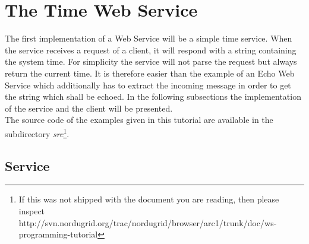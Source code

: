 \chapter{The Time Web Service}


The first implementation of a Web Service will be a simple time service. 
When the service receives a request of a client, it will respond with a string containing the system time.
For simplicity the service will not parse the request but always return the current time.
It is therefore easier than the example of an Echo Web Service which additionally has to extract the incoming message in order to get the string which shall be echoed.
In the following subsections the implementation of the service and the client will be presented.\\

The source code of the examples given in this tutorial are available in the subdirectory \textit{src}\footnote{If this was not shipped with the document you are reading, then please inspect\\ http://svn.nordugrid.org/trac/nordugrid/browser/arc1/trunk/doc/ws-programming-tutorial}.

\section{Service}


